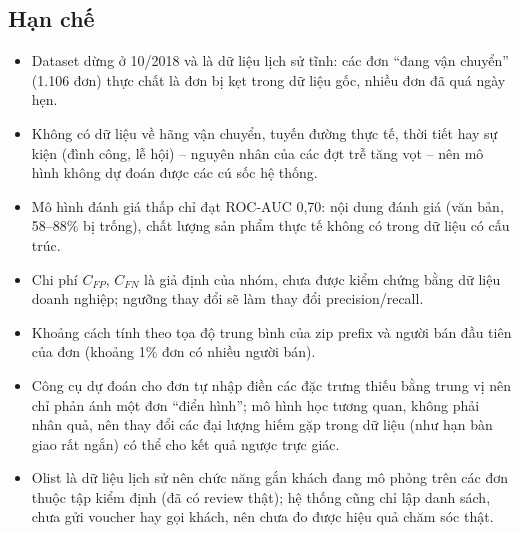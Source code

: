 \subsection{Hạn chế}
\begin{itemize}
    \item Dataset dừng ở 10/2018 và là dữ liệu lịch sử tĩnh: các đơn ``đang vận chuyển''
          (1.106 đơn) thực chất là đơn bị kẹt trong dữ liệu gốc, nhiều đơn đã quá ngày hẹn.
    \item Không có dữ liệu về hãng vận chuyển, tuyến đường thực tế, thời tiết hay sự kiện (đình
          công, lễ hội) -- nguyên nhân của các đợt trễ tăng vọt -- nên mô hình không dự đoán
          được các cú sốc hệ thống.
    \item Mô hình đánh giá thấp chỉ đạt ROC-AUC 0,70: nội dung đánh giá (văn bản, 58--88\% bị
          trống), chất lượng sản phẩm thực tế không có trong dữ liệu có cấu trúc.
    \item Chi phí $C_{FP}$, $C_{FN}$ là giả định của nhóm, chưa được kiểm chứng bằng dữ liệu
          doanh nghiệp; ngưỡng thay đổi sẽ làm thay đổi precision/recall.
    \item Khoảng cách tính theo tọa độ trung bình của zip prefix và người bán đầu tiên của đơn
          (khoảng 1\% đơn có nhiều người bán).
    \item Công cụ dự đoán cho đơn tự nhập điền các đặc trưng thiếu bằng trung vị nên chỉ phản ánh
          một đơn ``điển hình''; mô hình học tương quan, không phải nhân quả, nên thay đổi các
          đại lượng hiếm gặp trong dữ liệu (như hạn bàn giao rất ngắn) có thể cho kết quả ngược
          trực giác.
    \item Olist là dữ liệu lịch sử nên chức năng gắn khách đang mô phỏng trên các đơn thuộc tập
          kiểm định (đã có review thật); hệ thống cũng chỉ lập danh sách, chưa gửi voucher hay gọi
          khách, nên chưa đo được hiệu quả chăm sóc thật.
\end{itemize}

